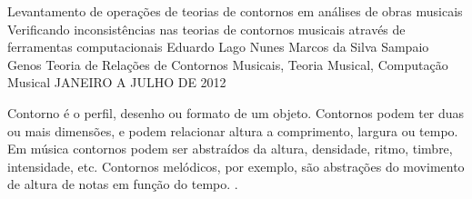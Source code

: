 \documentclass[11pt]{article}
\begin{document}
\graphicspath{{figs/}}


\dadosRelatorioFinal
{Levantamento de operações de teorias de contornos em análises de
  obras musicais}
{Verificando inconsistências nas teorias de contornos musicais através
  de ferramentas computacionais }
{Eduardo Lago Nunes}
{Marcos da Silva Sampaio}
{Genos}
{Teoria de Relações de Contornos Musicais, Teoria Musical, Computação Musical}
{JANEIRO A JULHO DE 2012}


\newpage

\setcounter{page}{1}
\onehalfspace






\label{sec:introducao}


Contorno é o perfil, desenho ou formato de um objeto. Contornos podem ter duas ou
mais dimensões, e podem relacionar altura a comprimento, largura ou tempo. Em música
contornos podem ser abstraídos da altura, densidade, ritmo, timbre, intensidade, etc.
Contornos melódicos, por exemplo, são abstrações do movimento de altura de notas em
função do tempo.
\cite[p. 01]{Sampaio2008}.
\end{document}
